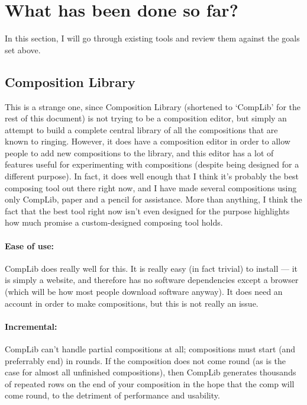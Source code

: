 \documentclass[12pt]{article}
\begin{document}
\section{What has been done so far?}

In this section, I will go through existing tools and review them against the goals set above.

\subsection{Composition Library}

This is a strange one, since Composition Library (shortened to `CompLib' for the rest of this
document) is not trying to be a composition editor, but simply an attempt to build a complete
central library of all the compositions that are known to ringing.  However, it does have a
composition editor in order to allow people to add new compositions to the library, and this
editor has a lot of features useful for experimenting with compositions (despite being designed for
a different purpose).  In fact, it does well enough that I think it's probably the best composing
tool out there right now, and I have made several compositions using only CompLib, paper and a
pencil for assistance.  More than anything, I think the fact that the best tool right now isn't even
designed for the purpose highlights how much promise a custom-designed composing tool holds.


\paragraph{Ease of use:}  CompLib does really well for this.  It is really easy (in fact trivial) to
install --- it is simply a website, and therefore has no software dependencies except a browser
(which will be how most people download software anyway).  It does need an account in order to make
compositions, but this is not really an issue.

\paragraph{Incremental:}  CompLib can't handle partial compositions at all; compositions must start
(and preferrably end) in rounds.  If the composition does not come round (as is the case for almost
all unfinished compositions), then CompLib generates thousands of repeated rows on the end of your
composition in the hope that the comp will come round, to the detriment of performance and
usability.
\end{document}
